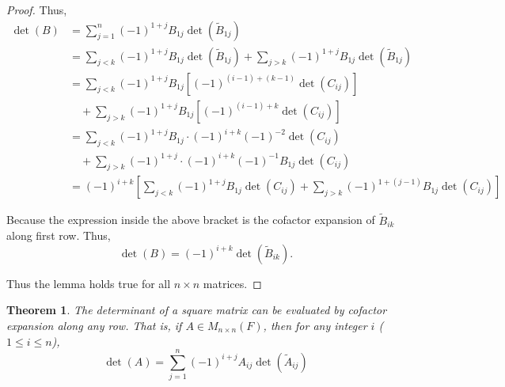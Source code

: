 \documentclass[12pt, a4paper]{article}
\newtheorem{theorem}{Theorem}[section]
\theoremstyle{definition}
\theoremstyle{remark}
\begin{document}
\begin{proof}
    Thus,
    \begin{align*}
    \det(B) &= \sum_{j=1}^{n} (-1)^{1+j} B_{1j} \det(\widetilde{B}_{1j}) \\
    &= \sum_{j < k} (-1)^{1+j} B_{1j} \det(\widetilde{B}_{1j}) + \sum_{j > k} (-1)^{1+j} B_{1j} \det(\widetilde{B}_{1j}) \\
    &= \sum_{j < k} (-1)^{1+j} B_{1j} \left[ (-1)^{(i-1)+(k-1)} \det(C_{ij}) \right] \\
    &\quad + \sum_{j > k} (-1)^{1+j} B_{1j} \left[ (-1)^{(i-1)+k} \det(C_{ij}) \right] \\
    &= \sum_{j < k} (-1)^{1+j} B_{1j} \cdot (-1)^{i+k} (-1)^{-2} \det(C_{ij}) \\
    &\quad + \sum_{j > k} (-1)^{1+j} \cdot (-1)^{i+k} (-1)^{-1} B_{1j} \det(C_{ij}) \\
    &= (-1)^{i+k} \left[ \sum_{j < k} (-1)^{1+j} B_{1j} \det(C_{ij}) + \sum_{j > k} (-1)^{1+(j-1)} B_{1j} \det(C_{ij}) \right]
    \end{align*}

    Because the expression inside the above bracket is the cofactor expansion of $\widetilde{B}_{ik}$ along first row. Thus,
    \[
    \det(B) = (-1)^{i+k} \det(\widetilde{B}_{ik}).
    \]

    Thus the lemma holds true for all $n \times n$ matrices.
    \end{proof}

    \begin{theorem}
    The determinant of a square matrix can be evaluated by cofactor expansion along any row. That is, if $A \in M_{n \times n}(F)$, then for any integer $i$ ($1 \le i \le n$),
    \[
    \det(A) = \sum_{j=1}^{n} (-1)^{i+j} A_{ij} \det(\widetilde{A}_{ij})
    \]
    \end{theorem}
\end{document}
